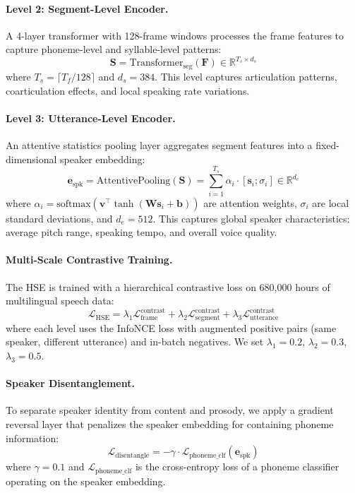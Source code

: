 \documentclass[11pt,a4paper]{article}
\begin{document}
\paragraph{Level 2: Segment-Level Encoder.} A 4-layer transformer with 128-frame windows processes the frame features to capture phoneme-level and syllable-level patterns:
\begin{equation}
    \bm{S} = \text{Transformer}_{\text{seg}}(\bm{F}) \in \mathbb{R}^{T_s \times d_s}
\end{equation}
where $T_s = \lceil T_f / 128 \rceil$ and $d_s = 384$. This level captures articulation patterns, coarticulation effects, and local speaking rate variations.

\paragraph{Level 3: Utterance-Level Encoder.} An attentive statistics pooling layer aggregates segment features into a fixed-dimensional speaker embedding:
\begin{equation}
    \bm{e}_{\text{spk}} = \text{AttentivePooling}(\bm{S}) = \sum_{i=1}^{T_s} \alpha_i \cdot [\bm{s}_i; \sigma_i] \in \mathbb{R}^{d_e}
\end{equation}
where $\alpha_i = \text{softmax}(\bm{v}^\top \tanh(\bm{W}\bm{s}_i + \bm{b}))$ are attention weights, $\sigma_i$ are local standard deviations, and $d_e = 512$. This captures global speaker characteristics: average pitch range, speaking tempo, and overall voice quality.

\paragraph{Multi-Scale Contrastive Training.} The HSE is trained with a hierarchical contrastive loss on 680,000 hours of multilingual speech data:
\begin{equation}
    \mathcal{L}_{\text{HSE}} = \lambda_1 \mathcal{L}_{\text{frame}}^{\text{contrast}} + \lambda_2 \mathcal{L}_{\text{segment}}^{\text{contrast}} + \lambda_3 \mathcal{L}_{\text{utterance}}^{\text{contrast}}
\end{equation}
where each level uses the InfoNCE loss \citep{oord2018representation} with augmented positive pairs (same speaker, different utterance) and in-batch negatives. We set $\lambda_1 = 0.2$, $\lambda_2 = 0.3$, $\lambda_3 = 0.5$.

\paragraph{Speaker Disentanglement.} To separate speaker identity from content and prosody, we apply a gradient reversal layer \citep{ganin2016domain} that penalizes the speaker embedding for containing phoneme information:
\begin{equation}
    \mathcal{L}_{\text{disentangle}} = -\gamma \cdot \mathcal{L}_{\text{phoneme\_clf}}(\bm{e}_{\text{spk}})
\end{equation}
where $\gamma = 0.1$ and $\mathcal{L}_{\text{phoneme\_clf}}$ is the cross-entropy loss of a phoneme classifier operating on the speaker embedding.
\end{document}
